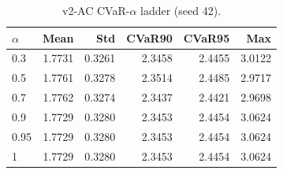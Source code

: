 \begin{table}[H]
    \centering
    \caption{v2-AC CVaR-$\alpha$ ladder (seed 42).}
    \label{tab:v2_ac_alpha}
    \begin{tabular}{@{}lrrrrr@{}}
        \toprule
        $\alpha$ & Mean & Std & CVaR90 & CVaR95 & Max \\
        \midrule
        0.3 & 1.7731 & 0.3261 & 2.3458 & 2.4455 & 3.0122 \\
        0.5 & 1.7761 & 0.3278 & 2.3514 & 2.4485 & 2.9717 \\
        0.7 & 1.7762 & 0.3274 & 2.3437 & 2.4421 & 2.9698 \\
        0.9 & 1.7729 & 0.3280 & 2.3453 & 2.4454 & 3.0624 \\
        0.95 & 1.7729 & 0.3280 & 2.3453 & 2.4454 & 3.0624 \\
        1 & 1.7729 & 0.3280 & 2.3453 & 2.4454 & 3.0624 \\
        \bottomrule
    \end{tabular}
\end{table}

